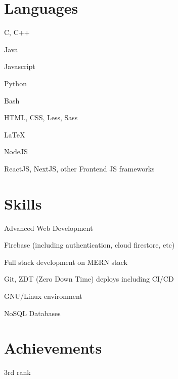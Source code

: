\documentclass[]{deedy-resume-openfont}
\begin{document}
\begin{minipage}[t]{0.4\textwidth}

	\section{Languages}
	\hspace{0.5em}
	\begin{tightemize}
		\item C, C++
		\item Java
		\item Javascript
		\item Python
	\end{tightemize}
	\sectionsep
	\begin{tightemize}
		\item Bash
		\item HTML, CSS, Less, Sass
		\item LaTeX
		\item NodeJS
		\item ReactJS, NextJS, other Frontend JS frameworks
	\end{tightemize}
	\sectionsep

	\section{Skills}
	\sectionsep
	\begin{tightemize}
		\item Advanced Web Development
		\item Firebase (including authentication, cloud firestore, etc)
		\item Full stack development on MERN stack
		\item Git, ZDT (Zero Down Time) deploys including CI/CD
		\item GNU/Linux environment
		\item NoSQL Databases
	\end{tightemize}
	\sectionsep

	\section{Achievements}
	\sectionsep
	\begin{tightemize}

		\item {}
		3rd rank

		\item {}


\end{tightemize}
\end{minipage}
\end{document}
